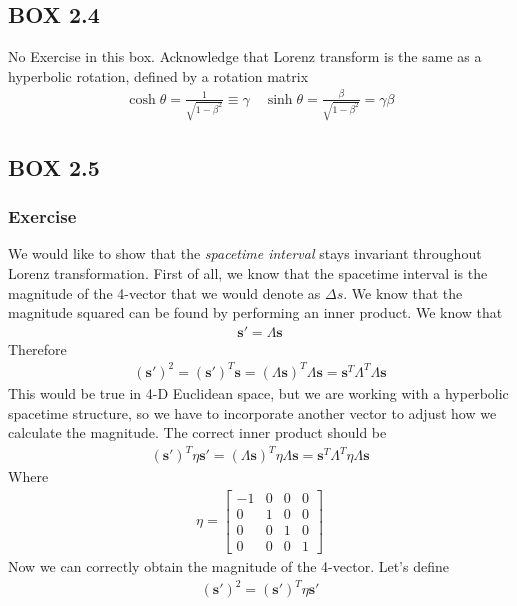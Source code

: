 \documentclass[12pt]{book}
\newcommand{\paren}[1]{\left( #1 \right)}
\begin{document}
\subsection{BOX 2.4}
No Exercise in this box. Acknowledge that Lorenz transform is the same as a hyperbolic rotation, defined by a rotation matrix
\begin{align}
\cosh\theta = \frac{1}{\sqrt{1-\beta^2}} \equiv \gamma \quad \sinh\theta = \frac{\beta}{\sqrt{1-\beta^2}}=\gamma \beta
\end{align}

\subsection{BOX 2.5}
\subsubsection{Exercise}
We would like to show that the \textit{spacetime interval} stays invariant throughout Lorenz transformation. First of all, we know that the spacetime interval is the magnitude of the 4-vector that we would denote as $\Delta s$. We know that the magnitude squared can be found by performing an inner product. We know that
\begin{align}
\mathbf{s'} = \Lambda\mathbf{s}
\end{align}
Therefore
\begin{align}
(\mathbf{s}')^2 = \paren{\mathbf{s}'}^T\mathbf{s} = \paren{\Lambda\mathbf{s}}^T\Lambda\mathbf{s} = \mathbf{s}^T\Lambda^T\Lambda\mathbf{s}
\end{align}
This would be true in 4-D Euclidean space, but we are working with a hyperbolic spacetime structure, so we have to incorporate another vector to adjust how we calculate the magnitude. The correct inner product should be
\begin{align}
\paren{\mathbf{s}'}^T\eta\mathbf{s}' = \paren{\Lambda\mathbf{s}}^T\eta \Lambda\mathbf{s} = \mathbf{s}^T\Lambda^T\eta \Lambda\mathbf{s}
\end{align}
Where 
\begin{align}
\eta = \begin{bmatrix}
    -1&0&0&0\\
    0&1&0&0\\
    0&0&1&0\\
    0&0&0&1
\end{bmatrix}
\end{align}
Now we can correctly obtain the magnitude of the 4-vector. Let's define
\begin{align}
\paren{\mathbf{s}'}^2 = \paren{\mathbf{s}'}^T\eta\mathbf{s}'
\end{align}
\end{document}
